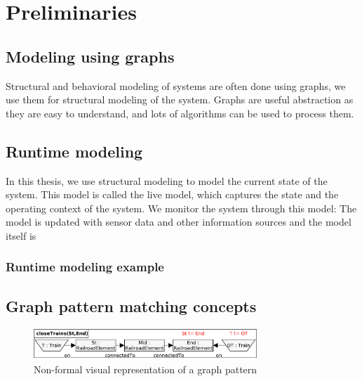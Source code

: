 
\chapter{Preliminaries}



\section{Modeling using graphs}

Structural and behavioral modeling of systems are often done using graphs, we use them for structural modeling of the system. Graphs are useful abstraction as they are easy to understand, and lots of algorithms can be used to process them.

\section{Runtime modeling}

In this thesis, we use structural modeling to model the current state of the system. This model is called the live model, which captures the state and the operating context of the system. We monitor the system through this model: The model is updated with sensor data and other information sources and the model itself is 

\subsection{Runtime modeling example}



\section{Graph pattern matching concepts}

\begin{figure}[h]
	\begin{center}
		\includegraphics[width=0.75\textwidth]{figures/pattern-visual.pdf}
		\caption{Non-formal visual representation of a graph pattern}
		\label{pattern-visual}
	\end{center}
\end{figure}

